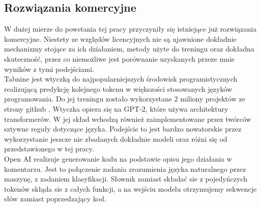 \subsection {Rozwiązania komercyjne}
W dużej mierze do powstania tej pracy przyczyniły się istniejące już rozwiązania komercyjne. Niestety 
ze względów licencyjnych nie są ujawnione dokładnie mechanizmy stojące za ich działaniem, metody użyte 
do treningu oraz dokładna skuteczność, przez co niemożliwe jest porównanie uzyskanych przeze mnie wyników 
z tymi podejściami. \\

Tabnine \cite{tabnine} jest wtyczką do najpopularniejszych środowisk programistycznych realizującą predykcję kolejnego tokenu w 
większości stosowanych języków programowania. Do jej treningu zostało wykorzystane 2 miliony projektów ze strony github \cite{github}. 
Wtyczka opiera się na GPT-2, które używa architektury transformerów. W jej skład wchodzą również zaimplementowane przez twórców
sztywne reguły dotyczące języka. Podejście to jest bardzo nowatorskie przez wykorzystanie jeszcze nie zbadanych dokładnie modeli oraz 
różni się od przedstawionego w tej pracy.\\

Open AI \cite{openai} realizuje generowanie kodu na podstawie opisu jego działania w komentarzu. Jest to połączenie zadania zrozumienia 
języka naturalnego przez maszynę, z zadaniem klasyfikacji. Słownik zamiast składać sie z pojedyńczych tokenów skłąda sie z całych funkcji, 
a na wejściu modelu otrzymujemy sekwencje słów zamiast poprzedzający kod. 

